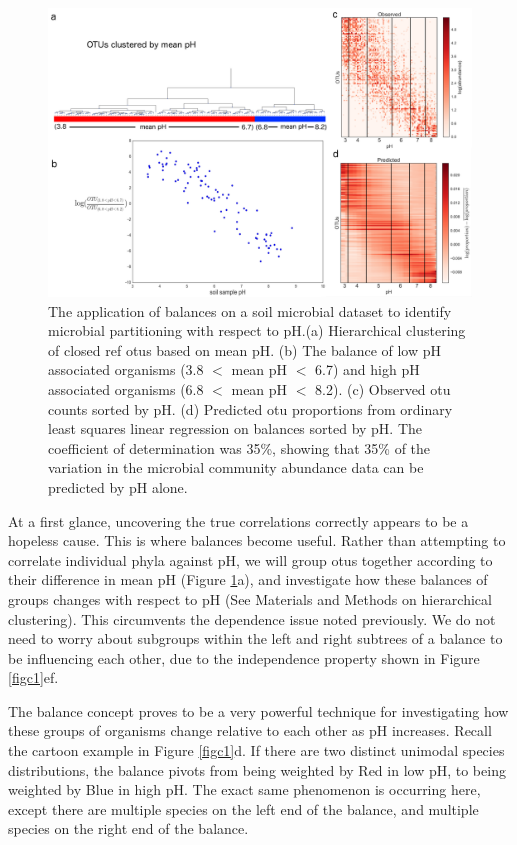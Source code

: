  \begin{figure}[H]
        \centering
        \includegraphics[width=1\textwidth]{ch3/Figure2.pdf}
        \caption[The application of balances on a soil microbial dataset to identify
          microbial partitioning with respect to pH.]
        {The application of balances on a soil microbial dataset to identify microbial partitioning with respect to pH.(a) Hierarchical clustering of closed ref \gls{otu}s based on mean pH. (b) The balance of low pH associated organisms (3.8 $<$ mean pH $<$ 6.7) and high pH associated organisms (6.8 $<$ mean pH $<$ 8.2). (c) Observed \gls{otu} counts sorted by pH. (d) Predicted \gls{otu} proportions from ordinary least squares linear regression on balances sorted by pH. The coefficient of determination was 35\%, showing that 35\% of the variation in the microbial community abundance data can be predicted by pH alone.}
        \label{figc2}
 \end{figure}
 At a first glance, uncovering the true correlations correctly appears to be a hopeless cause.  This is where balances become useful.  Rather than attempting to correlate individual phyla against pH, we will group \gls{otu}s together according to their difference in mean pH (Figure \ref{figc2}a), and investigate how these balances of groups changes with respect to pH (See Materials and Methods on hierarchical clustering).  This circumvents the dependence issue noted previously.  We do not need to worry about subgroups within the left and right subtrees of a balance to be influencing each other, due to the independence property shown in Figure \ref{figc1}ef.  \par
 The balance concept proves to be a very powerful technique for investigating how these groups of organisms change relative to each other as pH increases.  Recall the cartoon example in Figure \ref{figc1}d.  If there are two distinct unimodal species distributions, the balance pivots from being weighted by Red in low pH, to being weighted by Blue in high pH.  The exact same phenomenon is occurring here, except there are multiple species on the left end of the balance, and multiple species on the right end of the balance.\par
